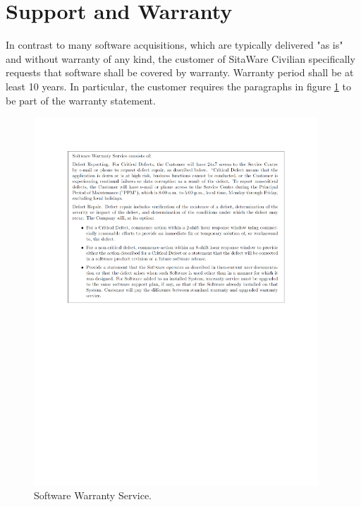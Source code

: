 \section{Support and Warranty}

In contrast to many software acquisitions, which are typically delivered "as is" and without warranty of any kind, the customer of SitaWare Civilian specifically requests that software shall be covered by warranty. Warranty period shall be at least 10 years. In particular, the customer requires the paragraphs in figure \ref{fig:warranty} to be part of the warranty statement.

\begin{figure}[H]
\centering
\includegraphics[trim = 25mm 135mm 20mm 25mm, width=0.95\textwidth]
{billeder/warranty.pdf}
\caption{Software Warranty Service.}
\label{fig:warranty}
\end{figure}